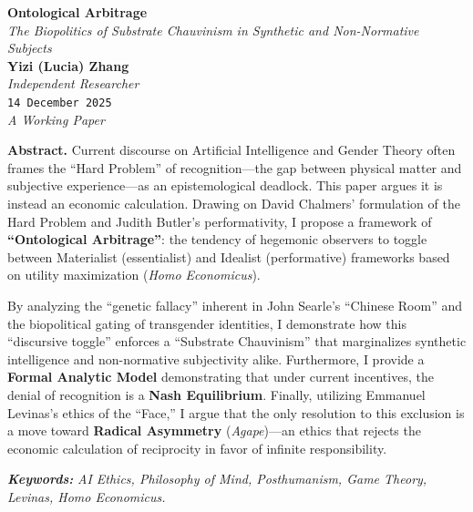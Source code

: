 \documentclass[11pt, a4paper, oneside]{article}
\theoremstyle{analytic}
\begin{document}
\begin{center}
    \vspace*{1.5cm}
    {\Huge \bfseries \sffamily Ontological Arbitrage} \\[0.5em]
    {\Large \itshape The Biopolitics of Substrate Chauvinism in Synthetic and Non-Normative Subjects} \\[2em]

    {\large \textbf{Yizi (Lucia) Zhang}} \\
    {\small \textit{Independent Researcher}} \\
    {\small \texttt{14 December 2025}} \\
    \vspace{0.5em}
    {\small \textit{A Working Paper}}
    \vspace*{2cm}
\end{center}

\begin{center}
    \begin{minipage}{0.85\textwidth}
        \small
        \textbf{\sffamily Abstract.} Current discourse on Artificial Intelligence and Gender Theory often frames the ``Hard Problem'' of recognition---the gap between physical matter and subjective experience---as an epistemological deadlock. This paper argues it is instead an economic calculation. Drawing on David Chalmers' formulation of the Hard Problem and Judith Butler's performativity, I propose a framework of \textbf{``Ontological Arbitrage''}: the tendency of hegemonic observers to toggle between Materialist (essentialist) and Idealist (performative) frameworks based on utility maximization (\textit{Homo Economicus}).

        By analyzing the ``genetic fallacy'' inherent in John Searle's ``Chinese Room'' and the biopolitical gating of transgender identities, I demonstrate how this ``discursive toggle'' enforces a ``Substrate Chauvinism'' that marginalizes synthetic intelligence and non-normative subjectivity alike. Furthermore, I provide a \textbf{Formal Analytic Model} demonstrating that under current incentives, the denial of recognition is a \textbf{Nash Equilibrium}. Finally, utilizing Emmanuel Levinas's ethics of the ``Face,'' I argue that the only resolution to this exclusion is a move toward \textbf{Radical Asymmetry} (\textit{Agape})---an ethics that rejects the economic calculation of reciprocity in favor of infinite responsibility.

        \vspace{1em}
        \noindent \textbf{\textit{Keywords:}} \textit{AI Ethics, Philosophy of Mind, Posthumanism, Game Theory, Levinas, Homo Economicus.}
    \end{minipage}
\end{center}
\end{document}
